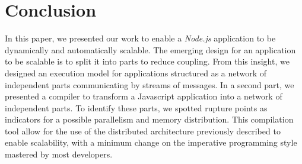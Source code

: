 \section{Conclusion} \label{section:conclusion}

In this paper, we presented our work to enable a \textit{Node.js} application to be dynamically and automatically scalable.
The emerging design for an application to be scalable is to split it into parts to reduce coupling.
From this insight, we designed an execution model for applications structured as a network of independent parts communicating by streams of messages.
In a second part, we presented a compiler to transform a Javascript application into a network of independent parts.
To identify these parts, we spotted rupture points as indicators for a possible parallelism and memory distribution.
This compilation tool allow for the use of the distributed architecture previously described to enable scalability, with a minimum change on the imperative programming style mastered by most developers.